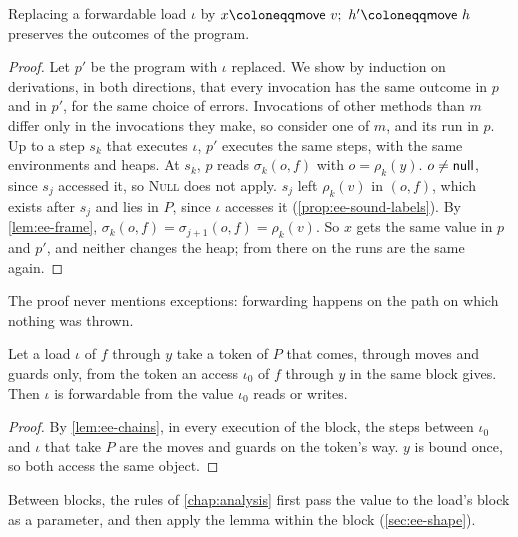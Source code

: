\begin{theorem}[Forwarding]\label{thm:ee-forwarding}
Replacing a forwardable load $\iota$ by $x \coloneqq \move\ v;\ h' \coloneqq
\move\ h$ preserves the outcomes of the program.
\end{theorem}

\begin{proof}
Let $p'$ be the program with $\iota$ replaced. We show by induction on
derivations, in both directions, that every invocation has the same outcome in
$p$ and in $p'$, for the same choice of errors. Invocations of other methods than $m$ differ only in the
invocations they make, so consider one of $m$, and its run in $p$. Up to a step
$s_k$ that executes $\iota$, $p'$ executes the same steps, with the same
environments and heaps. At $s_k$, $p$ reads $\sigma_k(o, f)$ with
$o = \rho_k(y)$. $o \neq \mathsf{null}$, since $s_j$ accessed it, so \textsc{Null} does
not apply. $s_j$ left $\rho_k(v)$ in $(o, f)$, which exists after $s_j$ and lies in
$P$, since $\iota$ accesses it (\cref{prop:ee-sound-labels}). By
\cref{lem:ee-frame}, $\sigma_k(o, f) = \sigma_{j+1}(o, f) = \rho_k(v)$. So $x$
gets the same value in $p$ and $p'$, and neither changes the heap; from there
on the runs are the same again.
\end{proof}

The proof never mentions exceptions: forwarding happens on the path on which
nothing was thrown.

\begin{lemma}\label{lem:ee-straight}
Let a load $\iota$ of $f$ through $y$ take a token of $P$ that comes, through
moves and guards only, from the token an access $\iota_0$ of $f$ through $y$ in
the same block gives. Then $\iota$ is forwardable from the value $\iota_0$
reads or writes.
\end{lemma}

\begin{proof}
By \cref{lem:ee-chains}, in every execution of the block, the steps between
$\iota_0$ and $\iota$ that take $P$ are the moves and guards on the token's
way. $y$ is bound once, so both access the same object.
\end{proof}

Between blocks, the rules of \cref{chap:analysis} first pass the value to the
load's block as a parameter, and then apply the lemma within the block
(\cref{sec:ee-shape}).


